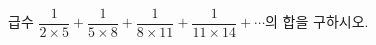 급수 $\dfrac{1}{2\times 5}+\dfrac{1}{5\times 8}+\dfrac{1}{8\times 11}+\dfrac{1}{11\times 14}+\cdots$의 합을 구하시오.
